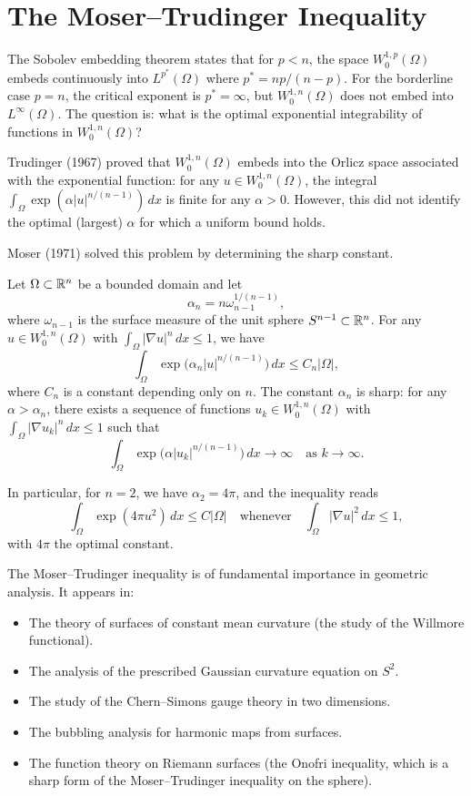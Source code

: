 \section{The Moser--Trudinger Inequality}

The Sobolev embedding theorem states that for $p < n$, the space $W^{1,p}_0(\Omega)$ embeds continuously into $L^{p^*}(\Omega)$ where $p^* = np/(n-p)$. For the borderline case $p = n$, the critical exponent is $p^* = \infty$, but $W^{1,n}_0(\Omega)$ does not embed into $L^\infty(\Omega)$. The question is: what is the optimal exponential integrability of functions in $W^{1,n}_0(\Omega)$?

Trudinger (1967) proved that $W^{1,n}_0(\Omega)$ embeds into the Orlicz space associated with the exponential function: for any $u \in W^{1,n}_0(\Omega)$, the integral $\int_\Omega \exp(\alpha |u|^{n/(n-1)})\,dx$ is finite for any $\alpha > 0$. However, this did not identify the optimal (largest) $\alpha$ for which a uniform bound holds.

Moser (1971) solved this problem by determining the sharp constant.

\begin{theorem}
Let $\Omega \subset \mathbb{R}^n$ be a bounded domain and let
\[
\alpha_n = n \omega_{n-1}^{1/(n-1)},
\]
where $\omega_{n-1}$ is the surface measure of the unit sphere $S^{n-1} \subset \mathbb{R}^n$. For any $u \in W^{1,n}_0(\Omega)$ with $\int_\Omega |\nabla u|^n\,dx \leq 1$, we have
\[
\int_\Omega \exp\bigl(\alpha_n |u|^{n/(n-1)}\bigr)\,dx \leq C_n |\Omega|,
\]
where $C_n$ is a constant depending only on $n$. The constant $\alpha_n$ is sharp: for any $\alpha > \alpha_n$, there exists a sequence of functions $u_k \in W^{1,n}_0(\Omega)$ with $\int_\Omega |\nabla u_k|^n\,dx \leq 1$ such that
\[
\int_\Omega \exp\bigl(\alpha |u_k|^{n/(n-1)}\bigr)\,dx \to \infty \quad \text{as } k \to \infty.
\]

In particular, for $n = 2$, we have $\alpha_2 = 4\pi$, and the inequality reads
\[
\int_\Omega \exp(4\pi u^2)\,dx \leq C |\Omega| \quad \text{whenever} \quad \int_\Omega |\nabla u|^2\,dx \leq 1,
\]
with $4\pi$ the optimal constant.
\end{theorem}

The Moser--Trudinger inequality is of fundamental importance in geometric analysis. It appears in:
\begin{itemize}
\item The theory of surfaces of constant mean curvature (the study of the Willmore functional).
\item The analysis of the prescribed Gaussian curvature equation on $S^2$.
\item The study of the Chern--Simons gauge theory in two dimensions.
\item The bubbling analysis for harmonic maps from surfaces.
\item The function theory on Riemann surfaces (the Onofri inequality, which is a sharp form of the Moser--Trudinger inequality on the sphere).
\end{itemize}

